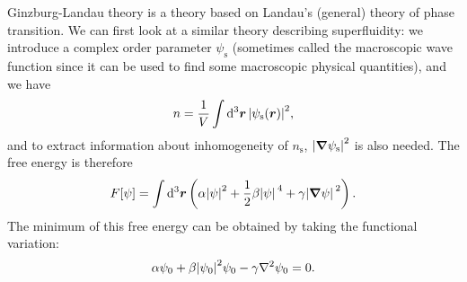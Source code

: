 \documentclass[hyperref, a4paper]{article}
\begin{document}
Ginzburg-Landau theory is a theory based on Landau's (general) theory of phase transition.
We can first look at a similar theory describing superfluidity:
we introduce a complex order parameter $\psi_{\text{s}}$ 
(sometimes called the macroscopic wave function 
since it can be used to find some macroscopic physical quantities),
and we have 
\begin{equation}
    n = \frac{1}{V} \int \dd[3]{\vb*{r}} \abs{\psi_{\text{s}}(\vb*{r})}^2,
\end{equation}
and to extract information about inhomogeneity of $n_{\text{s}}$, 
$\abs{\grad{\psi_{\text{s}}}}^2$ is also needed.
The free energy is therefore 
\begin{equation}
    F[\psi] = \int \dd[3]{\vb*{r}} \left(
        \alpha \abs{\psi}^2 + \frac{1}{2} \beta \abs*{\psi}^4 + \gamma \abs*{\grad{\psi}}^2
    \right).
\end{equation}
The minimum of this free energy can be obtained by taking the functional variation:
\begin{equation}
    \alpha \psi_0 + \beta \abs{\psi_0}^2 \psi_0 - \gamma \laplacian{\psi_0} = 0.
\end{equation}
\end{document}
